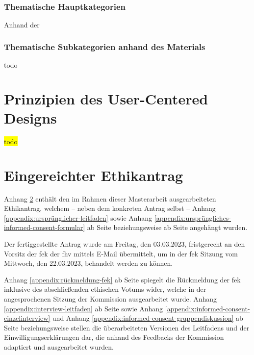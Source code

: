 \documentclass[a4paper,12pt,twoside]{scrreprt}
\begin{document}
\subsection{Thematische Hauptkategorien}
\label{sub-sec:thematische-hauptkategorien}

Anhand der 

\subsection{Thematische Subkategorien anhand des Materials}
\label{sub-sec:thematische-subkategorien}

todo

\chapter{Prinzipien des User-Centered Designs}
\label{chap:prinzipien-user-centered-design}

\colorbox{yellow}{todo}

\clearpage
{}
{}
\printbibliography

\appendix

\chapter{Eingereichter Ethikantrag}
\label{appendix:eingereichter-ethikantrag}

Anhang \ref{appendix:eingereichter-ethikantrag} enthält den im Rahmen dieser Masterarbeit ausgearbeiteten Ethikantrag, welchem -- neben dem konkreten Antrag selbst -- Anhang \ref{appendix:ursprünglicher-leitfaden} sowie Anhang \ref{appendix:ursprüngliches-informed-consent-formular} ab Seite \pageref{appendix:ursprünglicher-leitfaden} beziehungsweise ab Seite \pageref{appendix:ursprüngliches-informed-consent-formular} angehängt wurden.

Der fertiggestellte Antrag wurde am Freitag, den 03.03.2023, fristgerecht an den Vorsitz der \acl{fek} der \acl{fhv} mittels E-Mail übermittelt, um in der \ac{fek} Sitzung vom Mittwoch, den 22.03.2023, behandelt werden zu können.

\medskip 

Anhang \ref{appendix:rückmeldung-fek} ab Seite \pageref{appendix:rückmeldung-fek} spiegelt die Rückmeldung der \ac{fek} inklusive des abschließenden ethischen Votums wider, welche in der angesprochenen Sitzung der Kommission ausgearbeitet wurde. Anhang \ref{appendix:interview-leitfaden} ab Seite \pageref{appendix:interview-leitfaden} sowie Anhang \ref{appendix:informed-consent-einzelinterview} und Anhang \ref{appendix:informed-consent-gruppendiskussion} ab Seite \pageref{appendix:informed-consent-einzelinterview} beziehungsweise \pageref{appendix:informed-consent-gruppendiskussion} stellen die überarbeiteten Versionen des Leitfadens und der Einwilligungserklärungen dar, die anhand des Feedbacks der Kommission adaptiert und ausgearbeitet wurden.
\end{document}

